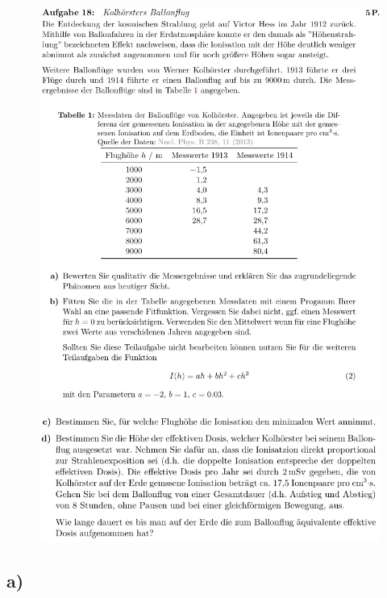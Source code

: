     \begin{figure}[H]
        \centering
        \includegraphics[width=\textwidth]{images/Aufgabe18a.jpg}
        \label{fig:5}
    \end{figure}

    \begin{figure}[H]
        \centering
        \includegraphics[width=\textwidth]{images/Aufgabe18b.jpg}
        \label{fig:6}
    \end{figure}

\subsection{a)}

